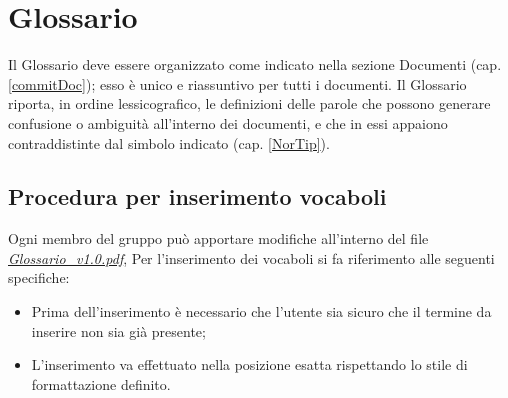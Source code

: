 \section{Glossario}{
	Il Glossario deve essere organizzato come indicato nella sezione Documenti (cap. \ref{commitDoc}); esso è unico e riassuntivo per tutti i documenti. 
	Il Glossario riporta, in ordine lessicografico, le definizioni delle parole che possono generare confusione o ambiguità all'interno dei documenti, 
	e che in essi appaiono contraddistinte dal simbolo indicato (cap. \ref{NorTip}).
		\subsection{Procedura per inserimento vocaboli}{
			Ogni membro del gruppo può apportare modifiche all'interno del file \emph{\href{../Esterni/Glossario_v1.0.pdf}{Glossario\_v1.0.pdf}},
			Per l'inserimento dei vocaboli si fa riferimento alle seguenti specifiche:
			\begin{itemize}
				\item Prima dell'inserimento è necessario che l'utente sia sicuro che il termine da inserire non sia già presente;
				\item L'inserimento va effettuato nella posizione esatta rispettando lo stile di formattazione definito.
			\end{itemize}
		}
}
